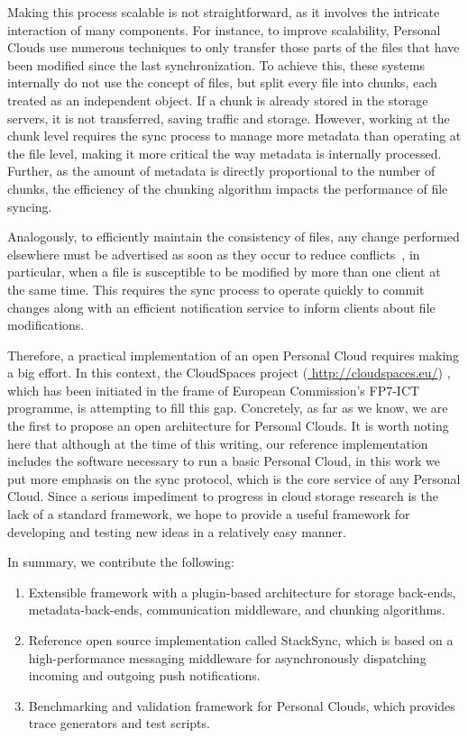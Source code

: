 Making
this process scalable is not straightforward, as it involves the intricate interaction of many components. For
instance, to improve scalability, Personal Clouds use numerous techniques to only transfer those parts of the
files that have been modified since the last synchronization. To achieve this, these systems internally do not
use the concept of files, but split every file into chunks, each treated as an independent object. If a chunk
is already stored in the storage servers, it is not transferred, saving traffic and storage. However, working
at the chunk level requires the sync process to manage more metadata than operating at the file level, making
it more critical the way metadata is internally processed. Further, as the amount of metadata is directly proportional
to the number of chunks, the efficiency of the chunking algorithm impacts the performance of file syncing.

Analogously, to efficiently maintain the consistency of files, any change performed elsewhere must be advertised 
as soon as they occur to reduce conflicts~\cite{drago2012inside}, in particular, when a file is susceptible to
be modified by more than one client at the same time. This requires the sync process to operate quickly to
commit changes along with an efficient notification service to inform clients about file modifications. 

Therefore, a practical implementation of an open Personal Cloud requires making a big effort. In 
this context, the CloudSpaces project (\url{ http://cloudspaces.eu/}) , which has been initiated
in the frame of European Commission's FP7-ICT programme, is attempting to fill this gap. Concretely,
as far as we know, we are the first to propose an open architecture for Personal Clouds. It is worth
noting here that although at the time of this writing, our reference implementation includes the
software necessary to run a basic Personal Cloud, in this work we put more emphasis on the sync protocol, which
is the core service of any Personal Cloud. Since a serious impediment to progress in cloud storage
research is the lack of a standard framework, we hope to provide a useful framework for developing
and testing new ideas in a relatively easy manner.

In summary, we contribute the following:

\begin{enumerate}
\item Extensible framework with a plugin-based architecture for  storage back-ends, metadata-back-ends,
 communication middleware, and chunking  algorithms.
\item Reference open source implementation called StackSync, which is based on a high-performance messaging middleware 
for asynchronously dispatching incoming and outgoing push notifications.
\item Benchmarking and validation framework for Personal Clouds, which provides trace generators and test scripts. 

\end{enumerate}


